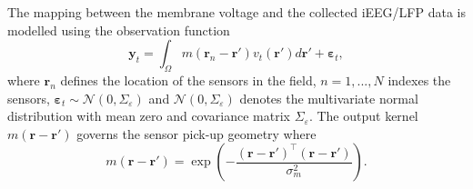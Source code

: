 \documentclass[10pt,a4paper]{article}
\begin{document}
The mapping between the membrane voltage and the collected iEEG/LFP data is modelled using the observation function 
\begin{equation}
    \label{eq:ObservationEquation}
	\mathbf{y}_t =
	\int_{\Omega}{
	    m\left(\mathbf{r}_n-\mathbf{r}'\right)v_t\left(\mathbf{r}'\right)
	d\mathbf{r}'} + 
	\boldsymbol{\varepsilon}_t, 
\end{equation}
where $\mathbf{r}_n$ defines the location of the sensors in the field, $n=1,...,N$ indexes the sensors, $\boldsymbol{\varepsilon}_t \sim \mathcal{N}\left(0,\Sigma_{\varepsilon}\right)$ and $\mathcal{N}\left(0,\Sigma_{\varepsilon}\right)$ denotes the multivariate normal distribution with mean zero and covariance matrix $\Sigma_{\varepsilon}$. The output kernel $m(\mathbf{r}-\mathbf{r}')$ governs the sensor pick-up geometry where 
\begin{equation}
	m\left(\mathbf{r}-\mathbf{r}'\right) = \exp{\left(-\frac{(\mathbf{r}-\mathbf{r}')^\top(\mathbf{r}-\mathbf{r}')}{\sigma_m^2}\right)}. 
\end{equation}
\end{document}
